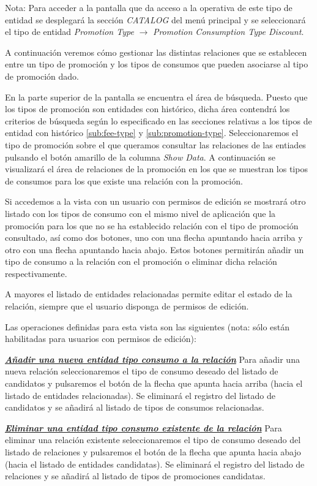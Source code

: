 Nota: Para acceder a la pantalla que da acceso a la operativa de este tipo de entidad se desplegará la sección \emph{CATALOG} del menú principal y se seleccionará el tipo de entidad \emph{Promotion Type} $\rightarrow$  \emph{Promotion Consumption Type Discount}.


A continuación veremos cómo gestionar las distintas relaciones que se establecen entre un tipo de promoción y los tipos de consumos que pueden asociarse al tipo de promoción dado.


En la parte superior de la pantalla se encuentra el área de búsqueda. Puesto que los tipos de promoción son entidades con histórico, dicha área contendrá los criterios de búsqueda según lo especificado en las secciones relativas a los tipos de entidad con histórico \ref{sub:fee-type} y \ref{sub:promotion-type}. 
Seleccionaremos el tipo de promoción sobre el que queramos consultar las relaciones de las entiades pulsando el botón amarillo de la columna \emph{Show Data}. A continuación se visualizará el área de relaciones de la promoción en los que se muestran los tipos de consumos para los que existe una relación con la promoción.


Si accedemos a la vista con un usuario con permisos de edición se mostrará otro listado con los tipos de consumo con el mismo nivel de aplicación que la promoción para los que no se ha establecido relación con el tipo de promoción consultado, así como dos botones, uno con una flecha apuntando hacia arriba y otro con una flecha apuntando hacia abajo. Estos botones permitirán añadir un tipo de consumo a la relación con el promoción o eliminar dicha relación respectivamente. 

A mayores el listado de entidades relacionadas permite editar el estado de la relación, siempre que el usuario disponga de permisos de edición.


Las operaciones definidas para esta vista son las siguientes (nota: sólo están habilitadas para usuarios con permisos de edición):

\underline{\textsl{\textbf{Añadir una nueva entidad tipo consumo a la relación}}} \newline
Para añadir una nueva relación seleccionaremos el tipo de consumo deseado del listado de candidatos y pulsaremos el botón de la flecha que apunta hacia arriba (hacia el listado de entidades relacionadas). Se eliminará el registro del listado de candidatos y se añadirá al listado de tipos de consumos relacionadas.


\underline{\textsl{\textbf{Eliminar una entidad tipo consumo existente de la relación}}}\newline
Para eliminar una relación existente seleccionaremos el tipo de consumo deseado del listado de relaciones y pulsaremos el botón de la flecha que apunta hacia abajo (hacia el listado de entidades candidatas). Se eliminará el registro del listado de relaciones y se añadirá al listado de tipos de promociones candidatas.


